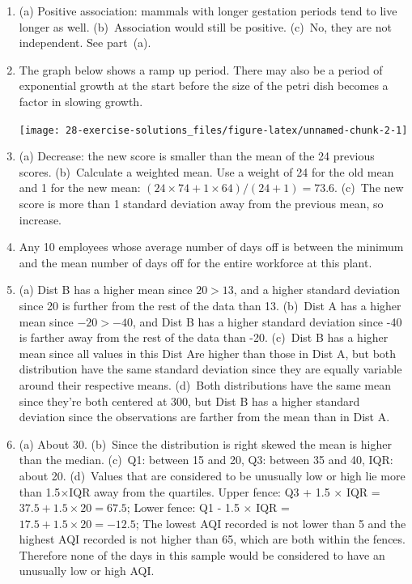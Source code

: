 \documentclass[
  10pt,
  openany]{book}
\begin{document}
\begin{enumerate}
\def\labelenumi{\arabic{enumi}.}
\item
  (a) Positive association: mammals with longer gestation periods tend to live longer as well. (b)~Association would still be positive. (c)~No, they are not independent. See part~(a).

  \addtocounter{enumi}{1}
\item
  The graph below shows a ramp up period. There may also be a period of exponential growth at the start before the size of the petri dish becomes a factor in slowing growth.

  \begin{center}\texttt{[image: 28-exercise-solutions\_files/figure-latex/unnamed-chunk-2-1]} \end{center}
  \addtocounter{enumi}{1}
\item
  (a) Decrease: the new score is smaller than the mean of the 24 previous scores. (b)~Calculate a weighted mean. Use a weight of 24 for the old mean and 1 for the new mean: \((24\times 74 + 1\times64)/(24+1) = 73.6\). (c)~The new score is more than 1 standard deviation away from the previous mean, so increase.

  \addtocounter{enumi}{1}
\item
  Any 10 employees whose average number of days off is between the minimum and the mean number of days off for the entire workforce at this plant.

  \addtocounter{enumi}{1}
\item
  (a) Dist B has a higher mean since \(20 > 13\), and a higher standard deviation since 20 is further from the rest of the data than 13. (b)~Dist A has a higher mean since \(-20 > -40\), and Dist B has a higher standard deviation since -40 is farther away from the rest of the data than -20. (c)~Dist B has a higher mean since all values in this Dist Are higher than those in Dist A, but both distribution have the same standard deviation since they are equally variable around their respective means. (d)~Both distributions have the same mean since they're both centered at 300, but Dist B has a higher standard deviation since the observations are farther from the mean than in Dist A.

  \addtocounter{enumi}{1}
\item
  (a) About 30. (b)~Since the distribution is right skewed the mean is higher than the median. (c)~Q1: between 15 and 20, Q3: between 35 and 40, IQR: about 20. (d)~Values that are considered to be unusually low or high lie more than 1.5\(\times\)IQR away from the quartiles. Upper fence: Q3 + 1.5 \(\times\) IQR = \(37.5 + 1.5 \times 20 = 67.5\); Lower fence: Q1 - 1.5 \(\times\) IQR = \(17.5 + 1.5 \times 20 = -12.5\); The lowest AQI recorded is not lower than 5 and the highest AQI recorded is not higher than 65, which are both within the fences. Therefore none of the days in this sample would be considered to have an unusually low or high AQI.


\end{enumerate}
\end{document}

